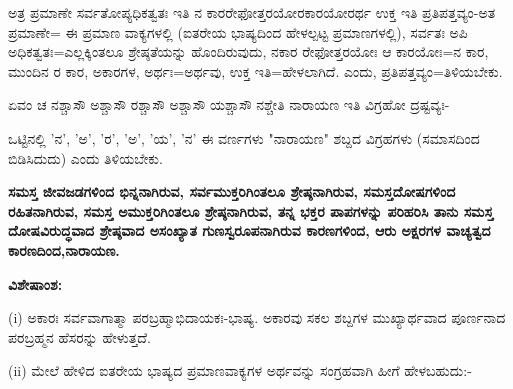 ಅತ್ರ ಪ್ರಮಾಣೇ ಸರ್ವತೋಪ್ಯಧಿಕತ್ವತಃ ಇತಿ ನ ಕಾರರೇಫೋತ್ತರಯೋರಕಾರಯೋರರ್ಥ ಉಕ್ತ ಇತಿ ಪ್ರತಿಪತ್ತವ್ಯಂ-ಅತ ಪ್ರಮಾಣೇ= ಈ ಪ್ರಮಾಣ ವಾಕ್ಯಗಳಲ್ಲಿ (ಐತರೇಯ ಭಾಷ್ಯದಿಂದ ಹೇಳಲ್ಪಟ್ಟ ಪ್ರಮಾಣಗಳಲ್ಲಿ), ಸರ್ವತಃ ಅಪಿ ಅಧಿಕತ್ವತಃ=ಎಲ್ಲಕ್ಕಿಂತಲೂ ಶ್ರೇಷ್ಠತೆಯನ್ನು ಹೊಂದಿರುವುದು, ನಕಾರ ರೇಫೋತ್ತರಯೋಃ ಆ ಕಾರಯೋಃ=ನ ಕಾರ, ಮುಂದಿನ ರ ಕಾರ, ಅಕಾರಗಳ, ಅರ್ಥಃ=ಅರ್ಥವು, ಉಕ್ತ ಇತಿ=ಹೇಳಲಾಗಿದೆ. ಎಂದು, ಪ್ರತಿ\-ಪತ್ತವ್ಯಂ=ತಿಳಿಯಬೇಕು.

ಏವಂ ಚ ನಶ್ಚಾಸೌ ಅಶ್ಚಾಸೌ ರಶ್ಚಾಸೌ ಅಶ್ಚಾಸೌ ಯಶ್ಚಾಸೌ ನಶ್ಚೇತಿ ನಾರಾಯಣ ಇತಿ ವಿಗ್ರಹೋ ದ್ರಷ್ಟವ್ಯಃ-

ಒಟ್ಟಿನಲ್ಲಿ 'ನ', 'ಅ', 'ರ', 'ಅ', 'ಯ', 'ನ' ಈ ವರ್ಣಗಳು "ನಾರಾಯಣ" ಶಬ್ದದ ವಿಗ್ರಹಗಳು (ಸಮಾಸದಿಂದ ಬಿಡಿಸಿದುದು) ಎಂದು ತಿಳಿಯಬೇಕು.

\textbf{ಸಮಸ್ತ ಜೀವಜಡಗಳಿಂದ ಭಿನ್ನನಾಗಿರುವ, ಸರ್ವಮುಕ್ತರಿಗಿಂತಲೂ ಶ್ರೇಷ್ಠನಾಗಿರುವ, ಸಮಸ್ತದೋಷಗಳಿಂದ ರಹಿತನಾಗಿರುವ, ಸಮಸ್ತ ಅಮುಕ್ತರಿಗಿಂತಲೂ ಶ್ರೇಷ್ಠನಾಗಿರುವ, ತನ್ನ ಭಕ್ತರ ಪಾಪಗಳನ್ನು ಪರಿಹರಿಸಿ ತಾನು ಸಮಸ್ತ ದೋಷವಿರುದ್ಧವಾದ ಶ್ರೇಷ್ಠವಾದ ಅಸಂಖ್ಯಾತ ಗುಣಸ್ವರೂಪನಾಗಿರುವ ಕಾರಣಗಳಿಂದ, ಆರು ಅಕ್ಷರಗಳ ವಾಚ್ಯತ್ವದ ಕಾರಣದಿಂದ,\break ನಾರಾಯಣ.}

\noindent
\textbf{ವಿಶೇಷಾಂಶ:\enginline{-}}

(i) ಅಕಾರಃ ಸರ್ವವಾಗಾತ್ಮಾ ಪರಬ್ರಹ್ಮಾಭಿದಾಯಕಃ-ಭಾಷ್ಯ. ಅಕಾರವು ಸಕಲ ಶಬ್ದಗಳ ಮುಖ್ಯಾರ್ಥವಾದ ಪೂರ್ಣನಾದ ಪರಬ್ರಹ್ಮನ ಹೆಸರನ್ನು ಹೇಳುತ್ತದೆ.

(ii) ಮೇಲೆ ಹೇಳಿದ ಐತರೇಯ ಭಾಷ್ಯದ ಪ್ರಮಾಣವಾಕ್ಯಗಳ ಅರ್ಥವನ್ನು ಸಂಗ್ರಹವಾಗಿ ಹೀಗೆ ಹೇಳಬಹುದು:-

